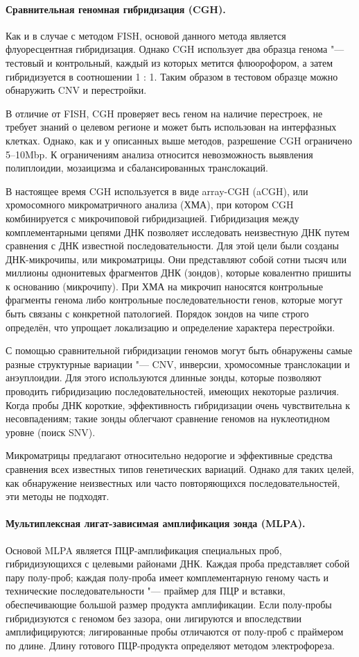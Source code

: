 \documentclass[a4paper,12pt]{article}
\begin{document}
\paragraph{Сравнительная геномная гибридизация (CGH).}
Как и в случае с методом FISH, основой данного метода является флуоресцентная гибридизация.
Однако CGH использует два образца генома "--- тестовый и контрольный, каждый из которых метится флюорофором, а затем гибридизуется в соотношении 1 : 1.
Таким образом в тестовом образце можно обнаружить CNV и перестройки.

В отличие от FISH, CGH проверяет весь геном на наличие перестроек, не требует знаний о целевом регионе и может быть использован на интерфазных клетках.
Однако, как и у описанных выше методов, разрешение CGH ограничено 5--10Mbp.
К ограничениям анализа относится невозможность выявления полиплоидии, мозаицизма и сбалансированных транслокаций.

В настоящее время CGH используется в виде array-CGH (aCGH), или хромосомного микроматричного анализа (ХМА), при котором CGH комбинируется с микрочиповой гибридизацией\cite{theisen}.
Гибридизация между комплементарными цепями ДНК позволяет исследовать неизвестную ДНК путем сравнения с ДНК известной последовательности.
Для этой цели были созданы ДНК-микрочипы, или микроматрицы.
Они представляют собой сотни тысяч или миллионы однонитевых фрагментов ДНК (зондов), которые ковалентно пришиты к основанию (микрочипу).
При ХМА на микрочип наносятся контрольные фрагменты генома либо контрольные последовательности генов, которые могут быть связаны с конкретной патологией.
Порядок зондов на чипе строго определён, что упрощает локализацию и определение характера перестройки.
    
С помощью сравнительной гибридизации геномов могут быть обнаружены самые разные структурные вариации "--- CNV, инверсии, хромосомные транслокации и анэуплоидии.
Для этого используются длинные зонды, которые позволяют проводить гибридизацию последовательностей, имеющих некоторые различия.
Когда пробы ДНК короткие, эффективность гибридизации очень чувствительна к несовпадениям; такие зонды облегчают сравнение геномов на нуклеотидном уровне (поиск SNV).

Микроматрицы предлагают относительно недорогие и эффективные средства сравнения всех известных типов генетических вариаций.
Однако для таких целей, как обнаружение неизвестных или часто повторяющихся последовательностей, эти методы не подходят\cite{gresham}.

\paragraph{Мультиплексная лигат-зависимая амплификация зонда (MLPA).}
Основой MLPA является ПЦР-амплификация специальных проб, гибридизующихся с целевыми районами ДНК.
Каждая проба представляет собой пару полу-проб;
каждая полу-проба имеет комплементарную геному часть и технические последовательности "--- праймер для ПЦР и вставки, обеспечивающие большой размер продукта амплификации.
Если полу-пробы гибридизуются с геномом без зазора, они лигируются и впоследствии амплифицируются;
лигированные пробы отличаются от полу-проб с праймером по длине.
Длину готового ПЦР-продукта определяют методом электрофореза.
\end{document}

